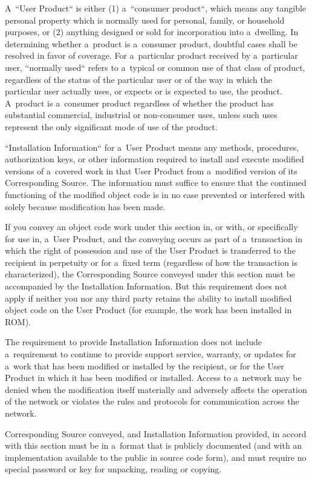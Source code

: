 \documentclass[a4paper, 11pt, twoside]{article}
\begin{document}
A~“User Product“ is either (1) a~“consumer product“, which means any tangible personal property which is normally used for personal, family, or household purposes, or (2) anything designed or sold for incorporation into a~dwelling. In determining whether a~product is a~consumer product, doubtful cases shall be resolved in favor of coverage. For a~particular product received by a~particular user, “normally used“ refers to a~typical or common use of that class of product, regardless of the status of the particular user or of the way in which the particular user actually uses, or expects or is expected to use, the product. A~product is a~consumer product regardless of whether the product has substantial commercial, industrial or non-consumer uses, unless such uses represent the only significant mode of use of the product.

“Installation Information“ for a~User Product means any methods, procedures, authorization keys, or other information required to install and execute modified versions of a~covered work in that User Product from a~modified version of its Corresponding Source. The information must suffice to ensure that the continued functioning of the modified object code is in no case prevented or interfered with solely because modification has been made.

If you convey an object code work under this section in, or with, or specifically for use in, a~User Product, and the conveying occurs as part of a~transaction in which the right of possession and use of the User Product is transferred to the recipient in perpetuity or for a~fixed term (regardless of how the transaction is characterized), the Corresponding Source conveyed under this section must be accompanied by the Installation Information. But this requirement does not apply if neither you nor any third party retains the ability to install modified object code on the User Product (for example, the work has been installed in ROM).

The requirement to provide Installation Information does not include a~requirement to continue to provide support service, warranty, or updates for a~work that has been modified or installed by the recipient, or for the User Product in which it has been modified or installed. Access to a~network may be denied when the modification itself materially and adversely affects the operation of the network or violates the rules and protocols for communication across the network.

Corresponding Source conveyed, and Installation Information provided, in accord with this section must be in a~format that is publicly documented (and with an implementation available to the public in source code form), and must require no special password or key for unpacking, reading or copying.
\end{document}
